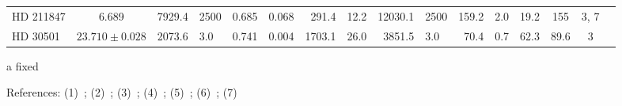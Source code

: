 \begin{table*}
\begin{threeparttable}[b]
\begin{tabular}{l c r@{$ \,\pm\, $}l r@{$ \,\pm\, $}l r@{$ \,\pm\, $}l r@{$ \,\pm\, $}l r@{$ \,\pm\, $}l cc c c}
            {HD 211847} 	 & 6.689\tnote{a} & 7929.4 & 2500  		    	 & 0.685 & 0.068   	  & 291.4   & 12.2   & 12030.1    & 2500   & 159.2 		& 2.0     & 19.2  & 155  				& 3, 7\\
            {HD 30501}  	  & $23.710\pm0.028$         & 2073.6 & 3.0 				& 0.741 & 0.004   	   & 1703.1 & 26.0   & 3851.5 		& 3.0     & 70.4 		& 0.7     & 62.3   & 89.6      			& 3  \\
            \bottomrule
        \end{tabular} \label{tab:orbitparams}
        \begin{tablenotes}
            \item [a]{fixed}
            \item[]References: (1)~\citet{crepp_trends_2016}; (2)~\citet{udry_coralie_2002}; (3)~\citet{sahlmann_search_2011};   (4)~\citet{pilyavsky_search_2011}; (5)~\citet{correia_coralie_2005};  (6)~\citet{benedict_hd_2017}; (7)~\citet{moutou_eccentricity_2017}
        \end{tablenotes}
    \end{threeparttable}
\end{table*}
